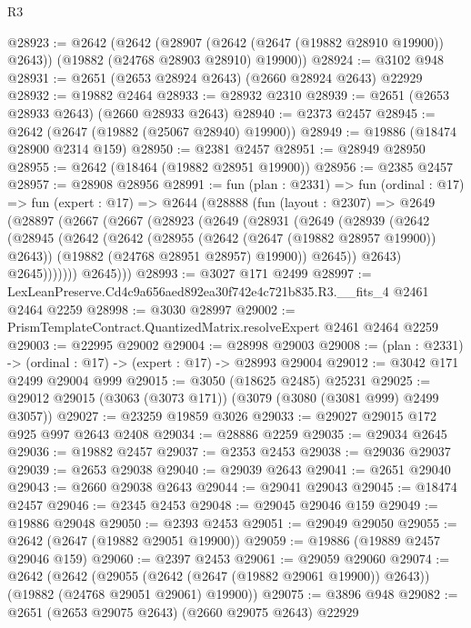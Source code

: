 \begin{lexlean}{R3}
\begin{coremodule}
@28923 := @2642
    (@2642
      (@28907 (@2642 (@2647 (@19882 @28910 @19900)) @2643))
      (@19882 (@24768 @28903 @28910) @19900))
@28924 := @3102 @948
@28931 := @2651 (@2653 @28924 @2643) (@2660 @28924 @2643) @22929
@28932 := @19882 @2464
@28933 := @28932 @2310
@28939 := @2651 (@2653 @28933 @2643) (@2660 @28933 @2643)
@28940 := @2373 @2457
@28945 := @2642 (@2647 (@19882 (@25067 @28940) @19900))
@28949 := @19886 (@18474 @28900 @2314 @159)
@28950 := @2381 @2457
@28951 := @28949 @28950
@28955 := @2642 (@18464 (@19882 @28951 @19900))
@28956 := @2385 @2457
@28957 := @28908 @28956
@28991 := fun (plan : @2331) =>
  fun (ordinal : @17) =>
  fun (expert : @17) =>
  @2644
    (@28888
      (fun (layout : @2307) =>
      @2649
        (@28897
          (@2667
            (@2667
              (@28923
                (@2649
                  (@28931
                    (@2649
                      (@28939
                        (@2642
                          (@28945
                            (@2642
                              (@2642
                                (@28955 (@2642 (@2647 (@19882 @28957 @19900)) @2643))
                                (@19882 (@24768 @28951 @28957) @19900))
                              @2645))
                          @2643)
                        @2645)))))))
          @2645)))
@28993 := @3027 @171 @2499
@28997 := LexLeanPreserve.Cd4c9a656aed892ea30f742e4c721b835.R3.__fits_4 @2461 @2464 @2259
@28998 := @3030 @28997
@29002 := PrismTemplateContract.QuantizedMatrix.resolveExpert @2461 @2464 @2259
@29003 := @22995 @29002
@29004 := @28998 @29003
@29008 := (plan : @2331) -> (ordinal : @17) -> (expert : @17) -> @28993 @29004
@29012 := @3042 @171 @2499 @29004 @999
@29015 := @3050 (@18625 @2485) @25231
@29025 := @29012 @29015 (@3063 (@3073 @171)) (@3079 (@3080 (@3081 @999) @2499 @3057))
@29027 := @23259 @19859 @3026
@29033 := @29027 @29015 @172 @925 @997 @2643 @2408
@29034 := @28886 @2259
@29035 := @29034 @2645
@29036 := @19882 @2457
@29037 := @2353 @2453
@29038 := @29036 @29037
@29039 := @2653 @29038
@29040 := @29039 @2643
@29041 := @2651 @29040
@29043 := @2660 @29038 @2643
@29044 := @29041 @29043
@29045 := @18474 @2457
@29046 := @2345 @2453
@29048 := @29045 @29046 @159
@29049 := @19886 @29048
@29050 := @2393 @2453
@29051 := @29049 @29050
@29055 := @2642 (@2647 (@19882 @29051 @19900))
@29059 := @19886 (@19889 @2457 @29046 @159)
@29060 := @2397 @2453
@29061 := @29059 @29060
@29074 := @2642
    (@2642
      (@29055 (@2642 (@2647 (@19882 @29061 @19900)) @2643))
      (@19882 (@24768 @29051 @29061) @19900))
@29075 := @3896 @948
@29082 := @2651 (@2653 @29075 @2643) (@2660 @29075 @2643) @22929

\end{coremodule}
\end{lexlean}
